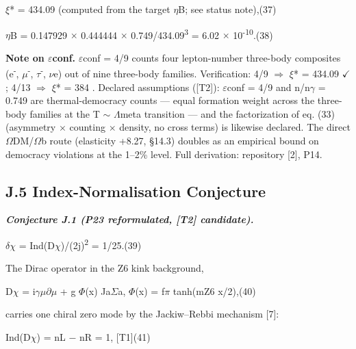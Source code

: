 \documentclass[11pt,letterpaper]{article}
\begin{document}
\begingroup\centering $\xi$* = 434.09  (computed from the target $\eta$B; see status note),\hspace{2em}(37)\par\endgroup

\begingroup\centering $\eta$B = 0.147929 $\times$ 0.444444 $\times$ 0.749/434.09\textsuperscript{3} = 6.02 $\times$ 10\textsuperscript{-10}.\hspace{2em}(38)\par\endgroup

\noindent \textbf{Note on $\varepsilon$conf. }$\varepsilon$conf = 4/9 counts four lepton-number three-body composites (e\textsuperscript{-}, $\mu$\textsuperscript{-}, $\tau$\textsuperscript{-}, $\nu$e) out of nine three-body families. Verification: 4/9 $\Rightarrow$ $\xi$* = 434.09 $\checkmark$; 4/13 $\Rightarrow$ $\xi$* = 384 . Declared assumptions ([T2]): $\varepsilon$conf = 4/9 and n/n$\gamma$ = 0.749 are thermal-democracy counts --- equal formation weight across the three-body families at the T $\sim$ $\Lambda$meta transition --- and the factorization of eq. (33) (asymmetry $\times$ counting $\times$ density, no cross terms) is likewise declared. The direct $\Omega$DM/$\Omega$b route (elasticity +8.27, §14.3) doubles as an empirical bound on democracy violations at the 1--2\% level. Full derivation: repository [2], P14.

\subsection*{J.5  Index-Normalisation Conjecture}

\noindent \textbf{\textit{Conjecture J.1 (P23 reformulated, [T2] candidate).}}

\begingroup\centering $\delta$$\chi$ = Ind(D$\chi$)/(2j)\textsuperscript{2} = 1/25.\hspace{2em}(39)\par\endgroup

\noindent The Dirac operator in the Z6 kink background,

\begingroup\centering D$\chi$ = i$\gamma$$\mu$$\partial$$\mu$ + g $\Phi$(x) Ja$\Sigma$a,   $\Phi$(x) = f$\pi$ tanh(mZ6 x/2),\hspace{2em}(40)\par\endgroup

\noindent carries one chiral zero mode by the Jackiw--Rebbi mechanism [7]:

\begingroup\centering Ind(D$\chi$) = nL $-$ nR = 1,   [T1]\hspace{2em}(41)\par\endgroup
\end{document}
